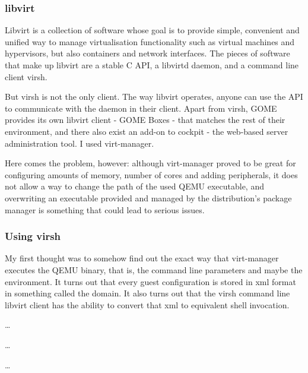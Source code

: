 \subsubsection{libvirt}


Libvirt is a collection of software whose goal is to provide simple, convenient
and unified way to manage virtualisation functionality such as virtual machines
and hypervisors, but also containers and network interfaces.  The pieces of
software that make up libvirt are a stable C API, a libvirtd daemon, and
a command line client virsh.

But virsh is not the only client.  The way libvirt operates, anyone can use the
API to communicate with the daemon in their client.  Apart from virsh, GOME
provides its own libvirt client - GOME Boxes - that matches the rest of their
environment, and there also exist an add-on to cockpit - the web-based server
administration tool.  I used virt-manager.

Here comes the problem, however: although virt-manager proved to be great for
configuring amounts of memory, number of cores and adding peripherals, it does
not allow a way to change the path of the used QEMU executable, and overwriting
an executable provided and managed by the distribution's package manager is
something that could lead to serious issues.

\subsubsection{Using virsh}


My first thought was to somehow find out the exact way that virt-manager
executes the QEMU binary, that is, the command line parameters and maybe the
environment.  It turns out that every guest configuration is stored in xml
format in something called the domain.  It also turns out that the virsh command
line libvirt client has the ability to convert that xml to equivalent shell
invocation.

\begin{codeblock}
    \dots
    
    \dots
    
    \dots
    
\end{codeblock}

